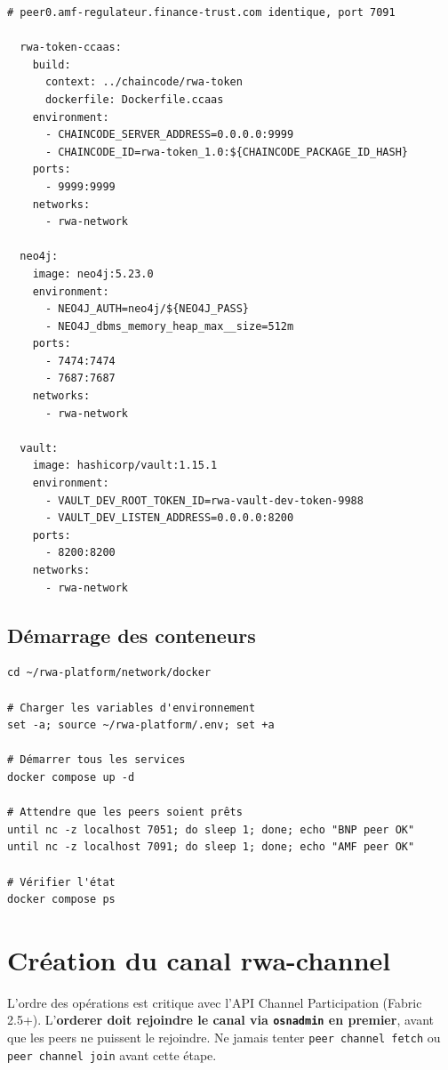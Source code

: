 \documentclass[12pt,a4paper,french]{article}
\begin{document}
\begin{lstlisting}[style=yaml, caption={network/docker/docker-compose.yaml (extrait principal)}]
  # peer0.amf-regulateur.finance-trust.com identique, port 7091

  rwa-token-ccaas:
    build:
      context: ../chaincode/rwa-token
      dockerfile: Dockerfile.ccaas
    environment:
      - CHAINCODE_SERVER_ADDRESS=0.0.0.0:9999
      - CHAINCODE_ID=rwa-token_1.0:${CHAINCODE_PACKAGE_ID_HASH}
    ports:
      - 9999:9999
    networks:
      - rwa-network

  neo4j:
    image: neo4j:5.23.0
    environment:
      - NEO4J_AUTH=neo4j/${NEO4J_PASS}
      - NEO4J_dbms_memory_heap_max__size=512m
    ports:
      - 7474:7474
      - 7687:7687
    networks:
      - rwa-network

  vault:
    image: hashicorp/vault:1.15.1
    environment:
      - VAULT_DEV_ROOT_TOKEN_ID=rwa-vault-dev-token-9988
      - VAULT_DEV_LISTEN_ADDRESS=0.0.0.0:8200
    ports:
      - 8200:8200
    networks:
      - rwa-network
\end{lstlisting}

\subsection{Démarrage des conteneurs}

\begin{lstlisting}[style=bash, caption={Démarrage de l'infrastructure}]
cd ~/rwa-platform/network/docker

# Charger les variables d'environnement
set -a; source ~/rwa-platform/.env; set +a

# Démarrer tous les services
docker compose up -d

# Attendre que les peers soient prêts
until nc -z localhost 7051; do sleep 1; done; echo "BNP peer OK"
until nc -z localhost 7091; do sleep 1; done; echo "AMF peer OK"

# Vérifier l'état
docker compose ps
\end{lstlisting}

\section{Création du canal rwa-channel}

\begin{alertbox}
L'ordre des opérations est critique avec l'API Channel Participation (Fabric 2.5+).
L'\textbf{orderer doit rejoindre le canal via \texttt{osnadmin} en premier}, avant que les peers
ne puissent le rejoindre. Ne jamais tenter \texttt{peer channel fetch} ou
\texttt{peer channel join} avant cette étape.
\end{alertbox}
\end{document}

